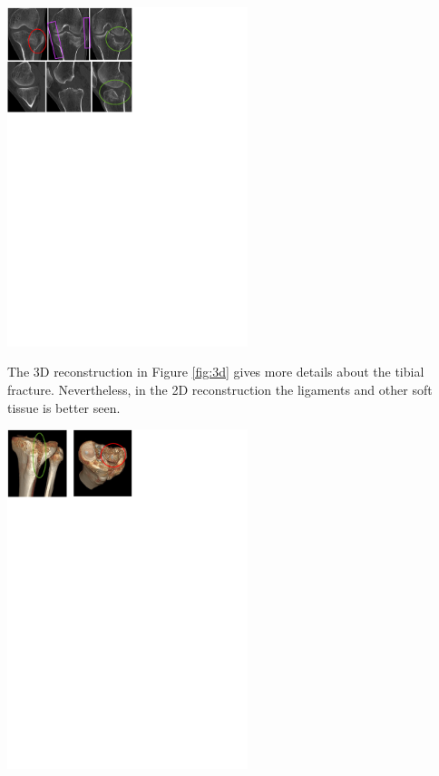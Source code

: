 \documentclass[a4paper]{article}
\newenvironment{Figure}
	{\par\medskip\noindent\minipage{\linewidth}}
	{\endminipage\par\medskip}
\begin{document}
\begin{multicols*}{2}
				\begin{Figure}
					\centering
					\includegraphics[trim={0cm 20.5cm 10cm 0},clip,width=7cm]{images/figure2_ct_scan.pdf}
					\label{fig:ct}
				\end{Figure}
				
				The 3D reconstruction in Figure \ref{fig:3d} gives more details about the tibial fracture.
				Nevertheless, in the 2D reconstruction the ligaments and other soft tissue is better seen.
				
				\begin{Figure}
					\centering
					\includegraphics[trim={0cm 23.5cm 10cm 0},clip,width=7cm]{images/figure3_3d.pdf}
					\label{fig:3d}
				\end{Figure}
				

\end{multicols*}
\end{document}
